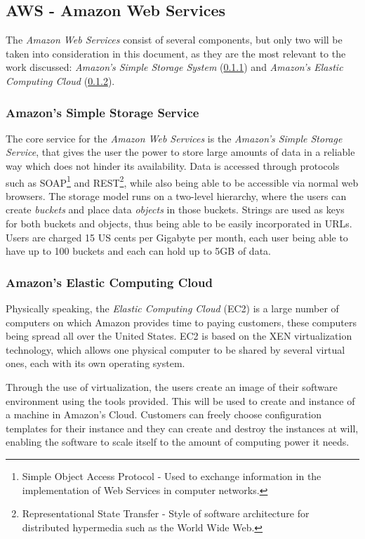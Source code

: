 \subsection{AWS - Amazon Web Services}\label{aws}

The \textit{Amazon Web Services} consist of several components, but only two will be taken into consideration in this document, as they are the most relevant to the work discussed: \textit{Amazon's Simple Storage System} (\ref{amazon-sss}) and \textit{Amazon's Elastic Computing Cloud} (\ref{amazon-ec}).

\subsubsection{Amazon's Simple Storage Service}\label{amazon-sss}

The core service for the \textit{Amazon Web Services} is the \textit{Amazon's Simple Storage Service}, that gives the user the power to store large amounts of data in a reliable way which does not hinder its availability. Data is accessed through protocols such as SOAP\footnote{Simple Object Access Protocol - Used to exchange information in the implementation of Web Services in computer networks.} and REST\footnote{Representational State Transfer - Style of software architecture for distributed hypermedia such as the World Wide Web.}, while also being able to be accessible via normal web browsers.
The storage model runs on a two-level hierarchy, where the users can create \textit{buckets} and place data \textit{objects} in those buckets. Strings are used as keys for both buckets and objects, thus being able to be easily incorporated in URLs. Users are charged 15 US cents per Gigabyte per month, each user being able to have up to 100 buckets and each can hold up to 5GB of data.\cite{hazel}

\subsubsection{Amazon's Elastic Computing Cloud}\label{amazon-ec}

Physically speaking, the \textit{Elastic Computing Cloud} (EC2) is a large number of computers on which Amazon provides time to paying customers, these computers being spread all over the United States. EC2 is based on the XEN virtualization technology, which allows one physical computer to be shared by several virtual ones, each with its own operating system.

Through the use of virtualization, the users create an image of their software environment using the tools provided. This will be used to create and instance of a machine in Amazon's Cloud. Customers can freely choose configuration templates for their instance and they can create and destroy the instances at will, enabling the software to scale itself to the amount of computing power it needs.\cite{grids-and-clouds, hazel}

